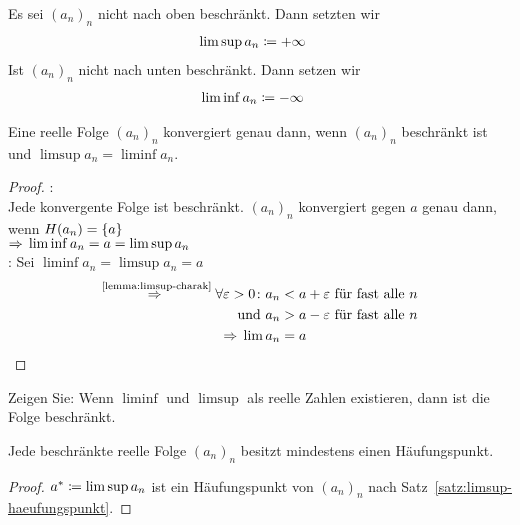 \begin{notation}
    Es sei $(a_n)_n$ nicht nach oben beschränkt. Dann setzten wir
    \begin{align*}
        \limsup a_n &\coloneqq +\infty
    \end{align*}
    Ist $(a_n)_n$ nicht nach unten beschränkt. Dann setzen wir
    \begin{align*}
        \liminf a_n &\coloneqq -\infty
    \end{align*}
\end{notation}

\begin{korollar}
    Eine reelle Folge $(a_n)_n$ konvergiert genau dann, wenn $(a_n)_n$ beschränkt ist und $\limsup a_n = \liminf a_n$.
    \begin{proof}
        \anf{$\impl$}:\\
        Jede konvergente Folge ist beschränkt. $(a_n)_n$ konvergiert gegen $a$ genau dann, wenn $H(a_n) = \left\{a\right\}$\\
        $\Rightarrow{} \liminf a_n = a = \limsup a_n$\\[10pt]
        \anf{$\Leftarrow$}: Sei $\liminf a_n = \limsup a_n = a$
        \begin{align*}
            \overset{\text{\ref{lemma:limsup-charak}}}{\Rightarrow{}} \forall \varepsilon > 0\colon a_n &< a+\varepsilon \text{ für fast alle $n$}\\
            \text{ und } a_n &> a-\varepsilon \text{ für fast alle } n\\
            \Rightarrow{} \lim a_n &= a\qedhere
        \end{align*}
    \end{proof}
\end{korollar}

\begin{uebung}
    Zeigen Sie: Wenn $\liminf$ und $\limsup$ als reelle Zahlen existieren, dann ist die Folge beschränkt.
\end{uebung}

\begin{satz} %
    \label{satz:bolzano-weierstrass}
    Jede beschränkte reelle Folge $(a_n)_n$ besitzt mindestens einen Häufungspunkt.

    \begin{proof}
        $a^* \coloneqq \limsup a_n$ ist ein Häufungspunkt von $(a_n)_n$ nach Satz~\ref{satz:limsup-haeufungspunkt}.
    \end{proof}
\end{satz}

